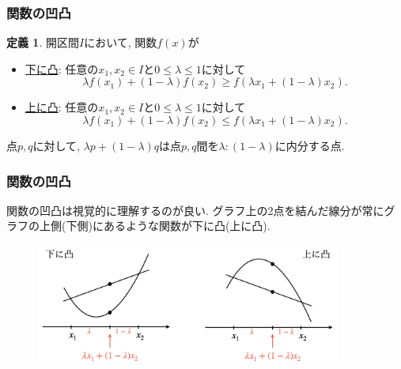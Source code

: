 \documentclass[dvipdfmx,cjk,10.2pt]{beamer}
\theoremstyle{definition}
\newtheorem{Def}[Thm]{定義}
\begin{document}



\begin{frame}
\frametitle{関数の凹凸}


\begin{Def}
開区間$I$において, 関数$f(x)$が
\begin{itemize}
\item \underline{下に凸}: 任意の$x_1,x_2 \in I$と$0 \le \lambda \le 1$に対して
$$
\lambda f(x_1)+(1-\lambda)f(x_2) \ge f(\lambda x_1+(1-\lambda)x_2). 
$$
\item \underline{上に凸}: 任意の$x_1,x_2 \in I$と$0 \le \lambda \le 1$に対して
$$
\lambda f(x_1)+(1-\lambda)f(x_2) \le f(\lambda x_1+(1-\lambda)x_2). 
$$
\end{itemize}
\end{Def}

点$p,q$に対して, $\lambda p+(1-\lambda)q$は点$p,q$間を$\lambda:(1-\lambda)$に内分する点. 


\end{frame}





\begin{frame}
\frametitle{関数の凹凸}


関数の凹凸は視覚的に理解するのが良い. 
グラフ上の2点を結んだ線分が常にグラフの上側(下側)にあるような関数が下に凸(上に凸).


 \begin{figure}[htbp]
 \begin{center} 
  \includegraphics[width=100mm]{convex.png}
 \end{center}
\end{figure}


\end{frame}
\end{document}

